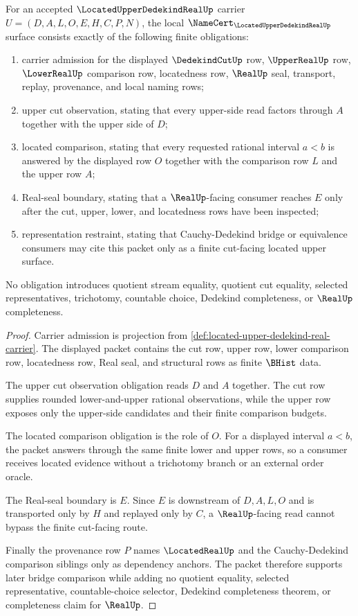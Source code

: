 \begin{theorem}
\label{thm:located-upper-dedekind-real-namecert-obligations}
For an accepted $\LocatedUpperDedekindRealUp$ carrier $U=(D,A,L,O,E,H,C,P,N)$, the local $\NameCert_{\LocatedUpperDedekindRealUp}$ surface consists exactly of the following finite obligations:
\begin{enumerate}
\item carrier admission for the displayed $\DedekindCutUp$ row, $\UpperRealUp$ row, $\LowerRealUp$ comparison row, locatedness row, $\RealUp$ seal, transport, replay, provenance, and local naming rows;
\item upper cut observation, stating that every upper-side read factors through $A$ together with the upper side of $D$;
\item located comparison, stating that every requested rational interval $a<b$ is answered by the displayed row $O$ together with the comparison row $L$ and the upper row $A$;
\item Real-seal boundary, stating that a $\RealUp$-facing consumer reaches $E$ only after the cut, upper, lower, and locatedness rows have been inspected;
\item representation restraint, stating that Cauchy-Dedekind bridge or equivalence consumers may cite this packet only as a finite cut-facing located upper surface.
\end{enumerate}
No obligation introduces quotient stream equality, quotient cut equality, selected representatives, trichotomy, countable choice, Dedekind completeness, or $\RealUp$ completeness.
\end{theorem}
\begin{proof}
Carrier admission is projection from \autoref{def:located-upper-dedekind-real-carrier}. The displayed packet contains the cut row, upper row, lower comparison row, locatedness row, Real seal, and structural rows as finite $\BHist$ data.

The upper cut observation obligation reads $D$ and $A$ together. The cut row supplies rounded lower-and-upper rational observations, while the upper row exposes only the upper-side candidates and their finite comparison budgets.

The located comparison obligation is the role of $O$. For a displayed interval $a<b$, the packet answers through the same finite lower and upper rows, so a consumer receives located evidence without a trichotomy branch or an external order oracle.

The Real-seal boundary is $E$. Since $E$ is downstream of $D,A,L,O$ and is transported only by $H$ and replayed only by $C$, a $\RealUp$-facing read cannot bypass the finite cut-facing route.

Finally the provenance row $P$ names $\LocatedRealUp$ and the Cauchy-Dedekind comparison siblings only as dependency anchors. The packet therefore supports later bridge comparison while adding no quotient equality, selected representative, countable-choice selector, Dedekind completeness theorem, or completeness claim for $\RealUp$.
\end{proof}

